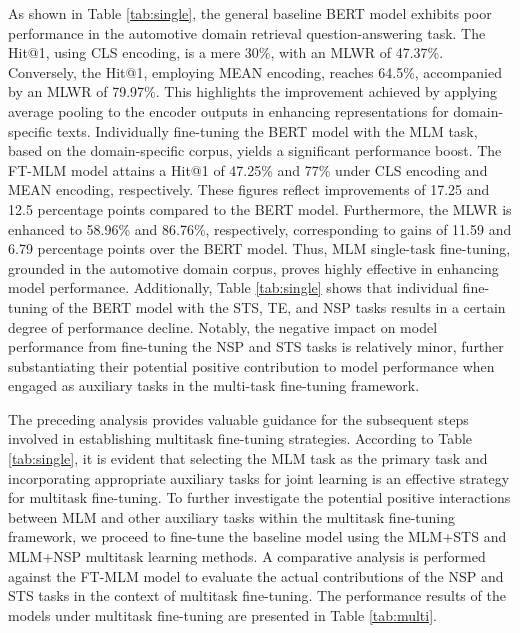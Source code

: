 \documentclass[mathematics,article,submit,moreauthors]{Definitions/mdpi}
\newcommand{\1}[1]{\mathds{1}\left[#1\right]}
\newcommand{\tableref}[1]{Table \ref{#1}}
\begin{document}
As shown in \tableref{tab:single}, the general baseline BERT model exhibits poor performance in the automotive domain retrieval question-answering task. The Hit@1, using CLS encoding, is a mere 30\%, with an MLWR of 47.37\%. Conversely, the Hit@1, employing MEAN encoding, reaches 64.5\%, accompanied by an MLWR of 79.97\%. This highlights the improvement achieved by applying average pooling to the encoder outputs in enhancing representations for domain-specific texts. Individually fine-tuning the BERT model with the MLM task, based on the domain-specific corpus, yields a significant performance boost. The FT-MLM model attains a Hit@1 of 47.25\% and 77\% under CLS encoding and MEAN encoding, respectively. These figures reflect improvements of 17.25 and 12.5 percentage points compared to the BERT model. Furthermore, the MLWR is enhanced to 58.96\% and 86.76\%, respectively, corresponding to gains of 11.59 and 6.79 percentage points over the BERT model. Thus, MLM single-task fine-tuning, grounded in the automotive domain corpus, proves highly effective in enhancing model performance. Additionally, \tableref{tab:single} shows that individual fine-tuning of the BERT model with the STS, TE, and NSP tasks results in a certain degree of performance decline. Notably, the negative impact on model performance from fine-tuning the NSP and STS tasks is relatively minor, further substantiating their potential positive contribution to model performance when engaged as auxiliary tasks in the multi-task fine-tuning framework.

The preceding analysis provides valuable guidance for the subsequent steps involved in establishing multitask fine-tuning strategies. According to \tableref{tab:single}, it is evident that selecting the MLM task as the primary task and incorporating appropriate auxiliary tasks for joint learning is an effective strategy for multitask fine-tuning. To further investigate the potential positive interactions between MLM and other auxiliary tasks within the multitask fine-tuning framework, we proceed to fine-tune the baseline model using the MLM+STS and MLM+NSP multitask learning methods. A comparative analysis is performed against the FT-MLM model to evaluate the actual contributions of the NSP and STS tasks in the context of multitask fine-tuning. The performance results of the models under multitask fine-tuning are presented in \tableref{tab:multi}.
\end{document}

